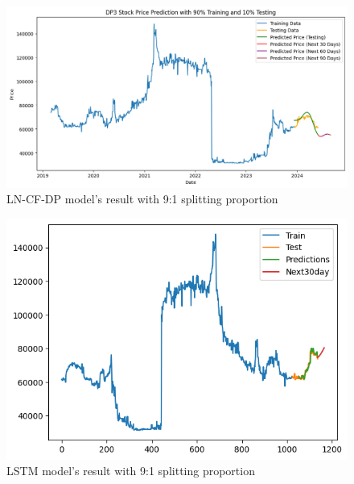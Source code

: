 \documentclass{ieeeojies}
\begin{document}
\vspace{-1em}

\begin{figure}[H]
  \centering
  \begin{minipage}{0.8\linewidth}
    \centering
    \includegraphics[width=\linewidth]{bibliography/Figure/DP3_LN_CF&DP.png}
    \caption{LN-CF-DP model's result with 9:1 splitting proportion}
    \label{fig8}
  \end{minipage}
\end{figure}

\vspace{-1em}

\begin{figure}[H]
  \centering
  \begin{minipage}{0.8\linewidth}
    \centering
    \includegraphics[width=\linewidth]{bibliography/Figure/LSTM_DP3(9_1).png}
    \caption{LSTM model's result with 9:1 splitting proportion}
    \label{fig8}
  \end{minipage}
\end{figure}
\end{document}
